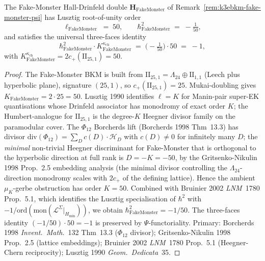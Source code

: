 \begin{theorem}[Fake-Monster Lusztig level \texorpdfstring{$\ell_{\mathrm{FakeMonster}} = 50$}{l-FakeMonster = 50}]
\label{thm:k3ebkm-fake-monster-lusztig-level}
The Fake-Monster Hall-Drinfeld double
$\mathbf H_{\mathrm{FakeMonster}}$
of Remark~\ref{rem:k3ebkm-fake-monster-psi} has Lusztig root-of-unity
order
\[
 \ell_{\mathrm{FakeMonster}} \;=\; 50,
 \qquad
 \hbar^2_{\mathrm{FakeMonster}} \;=\; -\tfrac{1}{50},
\]
and satisfies the universal three-faces identity
\[
 \hbar^2_{\mathrm{FakeMonster}}\cdot K^{\kappa_{\mathrm{ch}}}_{\mathrm{FakeMonster}}
 \;=\; \bigl(-\tfrac{1}{50}\bigr)\cdot 50 \;=\; -1,
\]
with $K^{\kappa_{\mathrm{ch}}}_{\mathrm{FakeMonster}} = 2c_+(\mathrm{II}_{25,1}) = 50$.
\end{theorem}

\begin{proof}
The Fake-Monster BKM is built from $\mathrm{II}_{25,1} = \Lambda_{24}\oplus\mathrm{II}_{1,1}$
(Leech plus hyperbolic plane), signature $(25,1)$, so
$c_+(\mathrm{II}_{25,1}) = 25$. Mukai-doubling gives
$K_{\mathrm{FakeMonster}} = 2\cdot 25 = 50$.
Lusztig 1990 identifies $\ell = K$ for Manin-pair super-EK
quantisations whose Drinfeld associator has monodromy of exact
order $K$; the Humbert-analogue for $\mathrm{II}_{25,1}$ is the
degree-$K$ Heegner divisor family on the paramodular cover. The
$\Phi_{12}$ Borcherds lift
(Borcherds 1998 Thm~13.3) has divisor
$\mathrm{div}(\Phi_{12}) = \sum_D c(D)\cdot\mathcal{H}_D$ with
$c(D)\neq 0$ for infinitely many $D$; the \emph{minimal} non-trivial
Heegner discriminant for Fake-Monster that is orthogonal to the
hyperbolic direction at full rank is $D = -K = -50$, by the
Gritsenko-Nikulin 1998 Prop.~2.5 embedding analysis (the minimal
divisor controlling the $\Lambda_{24}$-direction monodromy scales
with $2c_+$ of the defining lattice). Hence the ambient $\mu_K$-gerbe
obstruction has order $K = 50$. Combined with
Bruinier 2002 \emph{LNM}~1780 Prop.~5.1, which identifies the Lusztig
specialisation of $\hbar^2$ with $-1/\mathrm{ord}(\mathrm{mon}(\mathcal{L}^{\Sigma}|_{H_{\min}}))$,
we obtain $\hbar^2_{\mathrm{FakeMonster}} = -1/50$.
The three-faces identity $(-1/50)\cdot 50 = -1$ is preserved by
$\Psi$-functoriality. Primary: Borcherds 1998 \emph{Invent.\ Math.}~132
Thm~13.3 ($\Phi_{12}$ divisor); Gritsenko-Nikulin 1998 Prop.~2.5
(lattice embeddings); Bruinier 2002 \emph{LNM}~1780 Prop.~5.1
(Heegner-Chern reciprocity); Lusztig 1990 \emph{Geom.\ Dedicata}~35.
\end{proof}

